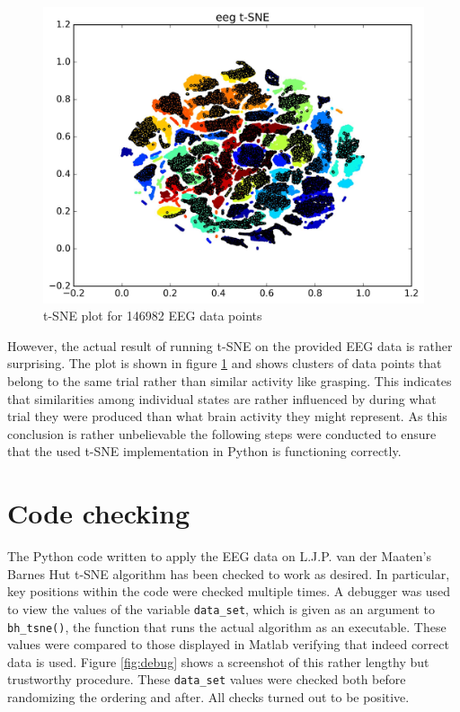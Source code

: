\documentclass{article} %
\begin{document}
\begin{figure}[h]
	\centering
	\includegraphics[width=1.0\textwidth]{eeg.jpg}
	\caption{t-SNE plot for 146982 EEG data points}
	\label{fig:eeg}
\end{figure}

However, the actual result of running t-SNE on the provided EEG data is rather surprising. The plot is shown in figure \ref{fig:eeg} and shows clusters of data points that belong to the same trial rather than similar activity like grasping. This indicates that similarities among individual states are rather influenced by during what trial they were produced than what brain activity they might represent.
As this conclusion is rather unbelievable the following steps were conducted to ensure that the used t-SNE implementation in Python is functioning correctly.




\section{Code checking}
The Python code written to apply the EEG data on L.J.P. van der Maaten's Barnes Hut t-SNE algorithm has been checked to work as desired. In particular, key positions within the code were checked multiple times. A debugger was used to view the values of the variable \verb|data_set|, which is given as an argument to \verb|bh_tsne()|, the function that runs the actual algorithm as an executable. These values were compared to those displayed in Matlab verifying that indeed correct data is used. Figure \ref{fig:debug} shows a screenshot of this rather lengthy but trustworthy procedure. These \verb|data_set| values were checked both before randomizing the ordering and after. All checks turned out to be positive.
\end{document}
